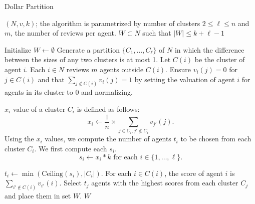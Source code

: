 \documentclass[letterpaper]{article}
\renewcommand{\algorithmicrequire}{\textbf{Input:}}
\renewcommand{\algorithmicensure}{\textbf{Output:}}
\newlength{\wordlength}
\newcommand{\wordbox}[3][c]{\settowidth{\wordlength}{#3}\makebox[\wordlength][#1]{#2}}
\begin{document}
\begin{algorithm}[ht!]
\caption{Dollar Partition}
\label{algo:DP}
\renewcommand{\algorithmicrequire}{\wordbox[l]{\textbf{Input}:}{\textbf{Output}:}}
\renewcommand{\algorithmicensure}{\wordbox[l]{\textbf{Output}:}{\textbf{Output}:}}
\footnotesize
\begin{algorithmic}
\footnotesize
\REQUIRE $(N,v,k)$; the algorithm is parametrized by number of clusters $2\leq \ell\leq n$ and $m$, the number of reviews per agent.
\ENSURE $W\subset N$ such that $|W|\leq k+\ell-1$
\end{algorithmic}
\begin{algorithmic}[1]
\footnotesize

\STATE Initialize $W\longleftarrow \emptyset$
\STATE Generate a partition $\{C_1,\ldots, C_{\ell}\}$ of $N$ in which the difference between the sizes of any two clusters is at most 1. Let $C(i)$ be the cluster of agent $i$. %
\STATE
Each $i\in N$ reviews $m$ agents outside $C(i)$.
Ensure $v_i(j)=0$ for $j\in C(i)$ and that $\sum_{j\notin C(i)}v_i(j)=1$ by setting the valuation of agent $i$ for agents in its cluster to $0$ and normalizing.

\STATE $x_i$ value of a cluster $C_i$ is defined as follows:
\[x_i\longleftarrow \frac{1}{n} \times \sum_{j\in C_i, j'\notin C_i}v_{j'}(j).\]
\STATE Using the $x_i$ values, we compute the number of agents $t_i$ to be chosen from each cluster $C_i$. We first compute each $s_i$.
\[s_i\longleftarrow x_i * k \text{ for each } i\in \{1,\ldots, \ell\}.\]


\STATE $t_i \longleftarrow \min(\text{Ceiling}{(s_i)}, |C_i|)$.
\ENDFOR
\STATE For each $i\in C(i)$, the score of agent $i$ is
$\sum_{i'\notin C(i)}v_{i'}(i).$
\STATE Select $t_j$ agents with the highest scores from each cluster $C_j$ and place them in set $W$.
\RETURN $W$
\end{algorithmic}
\end{algorithm}
\end{document}

